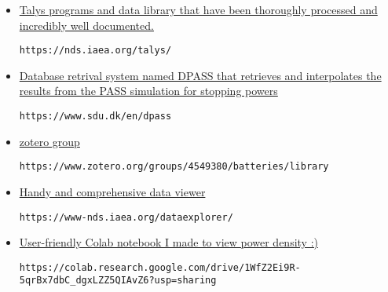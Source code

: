 \documentclass[12pt]{article}
\begin{document}
\begin{itemize}
\item \href{https://nds.iaea.org/talys/
}{Talys programs and data library that have been thoroughly processed and incredibly well documented.}
\begin{lstlisting}[breaklines]
https://nds.iaea.org/talys/
\end{lstlisting}


\item \href{https://www.sdu.dk/en/dpass
}{Database retrival system named DPASS that retrieves and interpolates the results from the PASS simulation for stopping powers}
\begin{lstlisting}[breaklines]
https://www.sdu.dk/en/dpass
\end{lstlisting}

\item \href{https://www.zotero.org/groups/4549380/batteries/library
}{zotero group}
\begin{lstlisting}[breaklines]
https://www.zotero.org/groups/4549380/batteries/library
\end{lstlisting}

\item \href{https://www-nds.iaea.org/dataexplorer/
}{Handy and comprehensive data viewer}
\begin{lstlisting}[breaklines]
https://www-nds.iaea.org/dataexplorer/
\end{lstlisting}

\item \href{https://colab.research.google.com/drive/1WfZ2Ei9R-5qrBx7dbC_dgxLZZ5QIAvZ6?usp=sharing
}{User-friendly Colab notebook I made to view power density :)}
\begin{lstlisting}[breaklines]
https://colab.research.google.com/drive/1WfZ2Ei9R-5qrBx7dbC_dgxLZZ5QIAvZ6?usp=sharing
\end{lstlisting}

\end{itemize}
\end{document}
